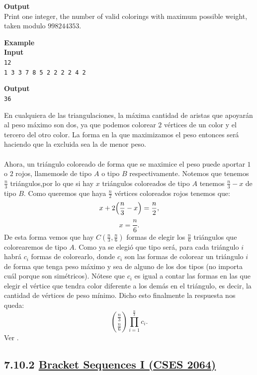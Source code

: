 \begin{center}
{\begin{minipage}{0.95\linewidth}
\vspace{0.5em}
\textbf{Output}\\
Print one integer, the number of valid colorings with maximum possible weight, taken modulo $998244353$.

\vspace{0.5em}
\textbf{Example}\\
\textbf{Input}\\
\texttt{12}\\
\texttt{1 3 3 7 8 5 2 2 2 2 4 2}

\textbf{Output}\\
\texttt{36}
\end{minipage}
}
\end{center}
    En cualquiera de las triangulaciones, la máxima cantidad de aristas que apoyarán al peso máximo son dos, ya que podemos colorear $2$ vértices de un color y el tercero del otro color. La forma en la que maximizamos el peso entonces será haciendo que la excluida sea la de menor peso.
    \\\\
    Ahora, un triángulo coloreado de forma que se maximice el peso puede aportar $1$ o $2$ rojos, llamemosle de tipo $A$ o tipo $B$ respectivamente. Notemos que tenemos $\frac{n}{3}$ triángulos,por lo que si hay $x$ triángulos coloreados de tipo $A$ tenemos $\frac{n}{3}-x$ de tipo $B$. Como queremos que haya $\frac{n}{2}$ vértices coloreados rojos tenemos que:
    \[
    x+2\Bigl(\frac{n}{3}-x\Bigr)=\frac{n}{2},
    \]
    \[
    x=\frac{n}{6}.
    \]
    De esta forma vemos que hay $C(\frac{n}{3},\frac{n}{6})$ formas de elegir los $\frac{n}{6}$ triángulos que colorearemos de tipo $A$. Como ya se elegió que tipo será, para cada triángulo $i$ habrá $c_i$ formas de colorearlo, donde $c_i$ son las formas de colorear un triángulo $i$ de forma que tenga peso máximo y sea de alguno de los dos tipos (no importa cuál porque son simétricos). Nótese que $c_i$ es igual a contar las formas en las que elegir el vértice que tendra color diferente a los demás en el triángulo, es decir, la cantidad de vértices de peso mínimo. Dicho esto finalmente la respuesta nos queda:
    \[
    \binom{\frac{n}{3}}{\frac{n}{6}}\prod_{i=1}^{\frac{n}{3}}c_i.
    \]
    Ver .

\subsection*{7.10.2 \href{https://cses.fi/problemset/task/2064}{Bracket Sequences I (CSES 2064)}}


